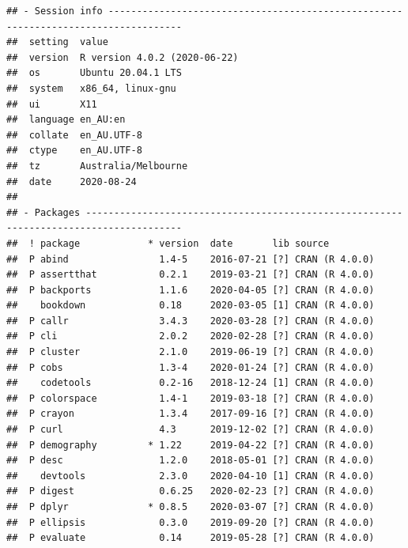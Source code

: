\documentclass[11pt,a4paper,]{article}
\begin{document}
\begin{verbatim}
## - Session info -----------------------------------------------------------------------------------
##  setting  value                       
##  version  R version 4.0.2 (2020-06-22)
##  os       Ubuntu 20.04.1 LTS          
##  system   x86_64, linux-gnu           
##  ui       X11                         
##  language en_AU:en                    
##  collate  en_AU.UTF-8                 
##  ctype    en_AU.UTF-8                 
##  tz       Australia/Melbourne         
##  date     2020-08-24                  
## 
## - Packages ---------------------------------------------------------------------------------------
##  ! package            * version  date       lib source                                         
##  P abind                1.4-5    2016-07-21 [?] CRAN (R 4.0.0)                                 
##  P assertthat           0.2.1    2019-03-21 [?] CRAN (R 4.0.0)                                 
##  P backports            1.1.6    2020-04-05 [?] CRAN (R 4.0.0)                                 
##    bookdown             0.18     2020-03-05 [1] CRAN (R 4.0.0)                                 
##  P callr                3.4.3    2020-03-28 [?] CRAN (R 4.0.0)                                 
##  P cli                  2.0.2    2020-02-28 [?] CRAN (R 4.0.0)                                 
##  P cluster              2.1.0    2019-06-19 [?] CRAN (R 4.0.0)                                 
##  P cobs                 1.3-4    2020-01-24 [?] CRAN (R 4.0.0)                                 
##    codetools            0.2-16   2018-12-24 [1] CRAN (R 4.0.0)                                 
##  P colorspace           1.4-1    2019-03-18 [?] CRAN (R 4.0.0)                                 
##  P crayon               1.3.4    2017-09-16 [?] CRAN (R 4.0.0)                                 
##  P curl                 4.3      2019-12-02 [?] CRAN (R 4.0.0)                                 
##  P demography         * 1.22     2019-04-22 [?] CRAN (R 4.0.0)                                 
##  P desc                 1.2.0    2018-05-01 [?] CRAN (R 4.0.0)                                 
##    devtools             2.3.0    2020-04-10 [1] CRAN (R 4.0.0)                                 
##  P digest               0.6.25   2020-02-23 [?] CRAN (R 4.0.0)                                 
##  P dplyr              * 0.8.5    2020-03-07 [?] CRAN (R 4.0.0)                                 
##  P ellipsis             0.3.0    2019-09-20 [?] CRAN (R 4.0.0)                                 
##  P evaluate             0.14     2019-05-28 [?] CRAN (R 4.0.0)                                 

\end{verbatim}
\end{document}
